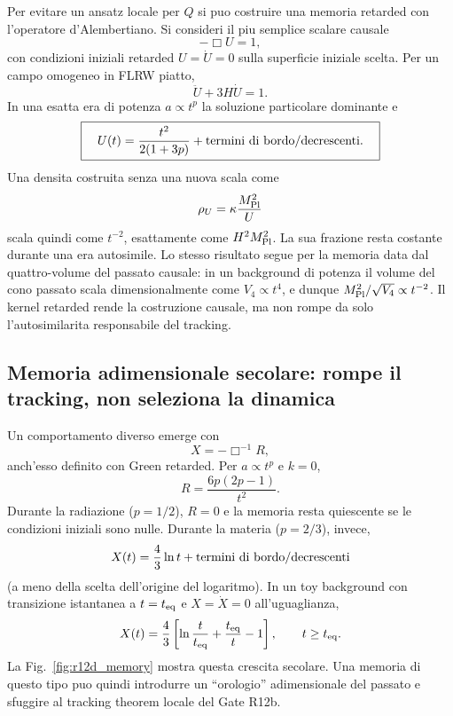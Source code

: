 \documentclass[11pt,a4paper]{article}
\begin{document}
Per evitare un ansatz locale per $Q$ si puo costruire una memoria retarded con l'operatore d'Alembertiano. Si consideri il piu semplice scalare causale
\begin{equation}
 -\Box U=1,
 \label{eq:r12d_boxU}
\end{equation}
con condizioni iniziali retarded $U=\dot U=0$ sulla superficie iniziale scelta. Per un campo omogeneo in FLRW piatto,
\begin{equation}
 \ddot U+3H\dot U=1.
\end{equation}
In una esatta era di potenza $a\propto t^p$ la soluzione particolare dominante e
\begin{equation}
 \boxed{\quad
 U(t)=\frac{t^2}{2(1+3p)}+\hbox{termini di bordo/decrescenti}.
 \quad}
 \label{eq:r12d_U_powerlaw}
\end{equation}
Una densita costruita senza una nuova scala come
\begin{equation}
 \rho_U=\kappa\frac{M_{\rm Pl}^2}{U}
\end{equation}
scala quindi come $t^{-2}$, esattamente come $H^2M_{\rm Pl}^2$. La sua frazione resta costante durante una era autosimile. Lo stesso risultato segue per la memoria data dal quattro-volume del passato causale: in un background di potenza il volume del cono passato scala dimensionalmente come $V_4\propto t^4$, e dunque $M_{\rm Pl}^2/\sqrt{V_4}\propto t^{-2}$. Il kernel retarded rende la costruzione causale, ma non rompe da solo l'autosimilarita responsabile del tracking.

\subsection{Memoria adimensionale secolare: rompe il tracking, non seleziona la dinamica}

Un comportamento diverso emerge con
\begin{equation}
 X=-\Box^{-1}R,
 \label{eq:r12d_X}
\end{equation}
anch'esso definito con Green retarded. Per $a\propto t^p$ e $k=0$,
\begin{equation}
 R=\frac{6p(2p-1)}{t^2}.
\end{equation}
Durante la radiazione ($p=1/2$), $R=0$ e la memoria resta quiescente se le condizioni iniziali sono nulle. Durante la materia ($p=2/3$), invece,
\begin{equation}
 X(t)=\frac43\ln t+\hbox{termini di bordo/decrescenti}
 \label{eq:r12d_X_matter_asymptotic}
\end{equation}
(a meno della scelta dell'origine del logaritmo). In un toy background con transizione istantanea a $t=t_{\rm eq}$ e $X=\dot X=0$ all'uguaglianza,
\begin{equation}
 X(t)=\frac43\left[\ln\frac{t}{t_{\rm eq}}+\frac{t_{\rm eq}}{t}-1\right],
 \qquad t\ge t_{\rm eq}.
 \label{eq:r12d_X_piecewise}
\end{equation}
La Fig.~\ref{fig:r12d_memory} mostra questa crescita secolare. Una memoria di questo tipo puo quindi introdurre un ``orologio'' adimensionale del passato e sfuggire al tracking theorem locale del Gate R12b.
\end{document}

